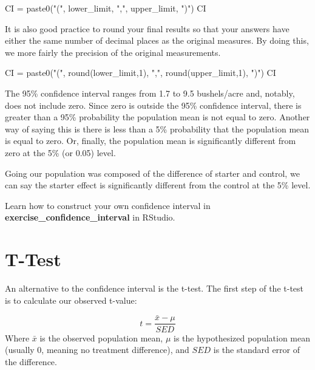 \documentclass[
]{book}
\newenvironment{Shaded}{\begin{snugshade}}{\end{snugshade}}
\newcommand{\DecValTok}[1]{\textcolor[rgb]{0.00,0.00,0.81}{#1}}
\newcommand{\FunctionTok}[1]{\textcolor[rgb]{0.00,0.00,0.00}{#1}}
\newcommand{\NormalTok}[1]{#1}
\newcommand{\OtherTok}[1]{\textcolor[rgb]{0.56,0.35,0.01}{#1}}
\newcommand{\StringTok}[1]{\textcolor[rgb]{0.31,0.60,0.02}{#1}}
\begin{document}
\begin{Shaded}
\begin{Highlighting}[]
\NormalTok{CI }\OtherTok{=} \FunctionTok{paste0}\NormalTok{(}\StringTok{"("}\NormalTok{, lower\_limit, }\StringTok{","}\NormalTok{, upper\_limit, }\StringTok{")"}\NormalTok{)}
\NormalTok{CI}
\end{Highlighting}
\end{Shaded}

It is also good practice to round your final results so that your
answers have either the same number of decimal places as the original
measures. By doing this, we more fairly the precision of the original
measurements.

\begin{Shaded}
\begin{Highlighting}[]
\NormalTok{CI }\OtherTok{=} \FunctionTok{paste0}\NormalTok{(}\StringTok{"("}\NormalTok{, }\FunctionTok{round}\NormalTok{(lower\_limit,}\DecValTok{1}\NormalTok{), }\StringTok{","}\NormalTok{, }
            \FunctionTok{round}\NormalTok{(upper\_limit,}\DecValTok{1}\NormalTok{), }\StringTok{")"}\NormalTok{)}
\NormalTok{CI}
\end{Highlighting}
\end{Shaded}

The 95\% confidence interval ranges from 1.7 to 9.5 bushels/acre and,
notably, does not include zero. Since zero is outside the 95\% confidence
interval, there is greater than a 95\% probability the population mean is
not equal to zero. Another way of saying this is there is less than a 5\%
probability that the population mean is equal to zero. Or, finally, the
population mean is significantly different from zero at the 5\% (or 0.05)
level.

Going our population was composed of the difference of starter and
control, we can say the starter effect is significantly different from
the control at the 5\% level.

Learn how to construct your own confidence interval in
\textbf{exercise\_confidence\_interval} in RStudio.

\hypertarget{t-test}{%
\section{T-Test}\label{t-test}}

An alternative to the confidence interval is the t-test. The first step
of the t-test is to calculate our observed t-value:

\[ t = \frac{\bar{x} - \mu}{SED} \] Where \(\bar{x}\) is the observed
population mean, \(\mu\) is the hypothesized population mean (usually 0,
meaning no treatment difference), and \(SED\) is the standard error of the
difference.
\end{document}
